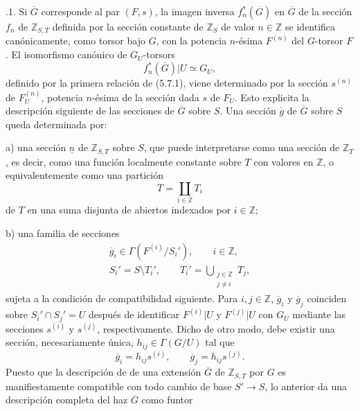 
\medskip
{}.1. Si $\overline G$ corresponde al par $(F,s)$, la
imagen inversa $f_n^*(\overline G)$ en $\overline G$ de la sección
$f_n$ de $\mathbb Z_{S,T}$ definida por la sección constante de
$\mathbb Z_S$ de valor $n\in\mathbb Z$ se identifica canónicamente,
como torsor bajo $G$, con la potencia $n$-ésima $F^{(n)}$ del
$G$-torsor $F$. El isomorfismo canónico de $G_U$-torsors
\[
 f_n^*(\overline G)|U\simeq G_U,
\]
definido por la primera relación de (5.7.1), viene determinado por la
sección $s^{(n)}$ de $F_U^{(n)}$, potencia $n$-ésima de la sección
dada $s$ de $F_U$. Esto explicita la descripción siguiente de las
secciones de $\overline G$ sobre $S$. Una sección $\overline g$ de
$\overline G$ sobre $S$ queda determinada por:

\smallskip
\noindent a) una sección $\underline n$ de $\mathbb Z_{S,T}$ sobre
$S$, que puede interpretarse como una sección de $\mathbb Z_T$, es
decir, como una función localmente constante sobre $T$ con valores en
$\mathbb Z$, o equivalentemente como una partición
\[
 T=\coprod_{i\in\mathbb Z}T_i
\]
de $T$ en una suma disjunta de abiertos indexados por
$i\in\mathbb Z$;

\smallskip
\noindent b) una familia de secciones
\[
 \begin{gathered}
  \overline g_i\in\Gamma(F^{(i)}/S_i'),\qquad i\in\mathbb Z,\\
  S_i'=S\setminus T_i',\qquad
  T_i'=\displaystyle\bigcup_{\substack{j\in\mathbb Z\\j\ne i}}T_j,
 \end{gathered}
\]
sujeta a la condición de compatibilidad siguiente. Para
$i,j\in\mathbb Z$, $\overline g_i$ y $\overline g_j$ coinciden sobre
$S_i'\cap S_j'=U$ después de identificar $F^{(i)}|U$ y $F^{(j)}|U$
con $G_U$ mediante las secciones $s^{(i)}$ y $s^{(j)}$,
respectivamente. Dicho de otro modo, debe existir una sección,
necesariamente única, $h_{ij}\in\Gamma(G/U)$ tal que
\[
 \overline g_i=h_{ij}s^{(i)},\qquad
 \overline g_j=h_{ij}s^{(j)}.
\]
Puesto que la descripción de  de una extensión
$\overline G$ de $\mathbb Z_{S,T}$ por $G$ es manifiestamente
compatible con todo cambio de base $S'\to S$, lo anterior da una
descripción completa del haz $\overline G$ como funtor


